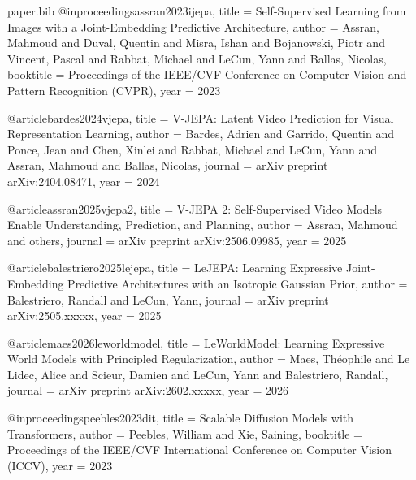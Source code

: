 \begin{filecontents*}{paper.bib}
@inproceedings{assran2023ijepa,
  title     = {Self-Supervised Learning from Images with a Joint-Embedding Predictive Architecture},
  author    = {Assran, Mahmoud and Duval, Quentin and Misra, Ishan and Bojanowski, Piotr and Vincent, Pascal and Rabbat, Michael and LeCun, Yann and Ballas, Nicolas},
  booktitle = {Proceedings of the IEEE/CVF Conference on Computer Vision and Pattern Recognition (CVPR)},
  year      = {2023}
}

@article{bardes2024vjepa,
  title   = {{V-JEPA}: Latent Video Prediction for Visual Representation Learning},
  author  = {Bardes, Adrien and Garrido, Quentin and Ponce, Jean and Chen, Xinlei and Rabbat, Michael and LeCun, Yann and Assran, Mahmoud and Ballas, Nicolas},
  journal = {arXiv preprint arXiv:2404.08471},
  year    = {2024}
}

@article{assran2025vjepa2,
  title   = {{V-JEPA 2}: Self-Supervised Video Models Enable Understanding, Prediction, and Planning},
  author  = {Assran, Mahmoud and others},
  journal = {arXiv preprint arXiv:2506.09985},
  year    = {2025}
}

@article{balestriero2025lejepa,
  title   = {{LeJEPA}: Learning Expressive Joint-Embedding Predictive Architectures with an Isotropic Gaussian Prior},
  author  = {Balestriero, Randall and LeCun, Yann},
  journal = {arXiv preprint arXiv:2505.xxxxx},
  year    = {2025}
}

@article{maes2026leworldmodel,
  title   = {{LeWorldModel}: Learning Expressive World Models with Principled Regularization},
  author  = {Maes, Th{\'e}ophile and {Le Lidec}, Alice and Scieur, Damien and LeCun, Yann and Balestriero, Randall},
  journal = {arXiv preprint arXiv:2602.xxxxx},
  year    = {2026}
}

@inproceedings{peebles2023dit,
  title     = {Scalable Diffusion Models with Transformers},
  author    = {Peebles, William and Xie, Saining},
  booktitle = {Proceedings of the IEEE/CVF International Conference on Computer Vision (ICCV)},
  year      = {2023}
}


\end{filecontents*}
